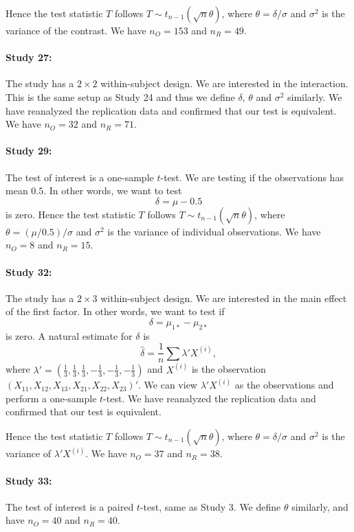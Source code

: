 \documentclass[11pt]{article}
\theoremstyle{definition}
\theoremstyle{custom}
\newcommand{\hdelta}{\hat{\delta}}
\begin{document}
  Hence the test statistic $T$ follows $T \sim t_{n-1}(\sqrt{n} \theta)$, where $\theta = \delta / \sigma$ and $\sigma^2$ is the variance of the contrast. We have $n_O = 153$ and $n_R = 49$.

  \paragraph{Study 27: \citet{Yap:2008fm}}
  The study has a $2 \times 2$ within-subject design. We are interested in the interaction. This is the same setup as Study 24 and thus we define $\delta$, $\theta$ and $\sigma^2$ similarly. We have reanalyzed the replication data and confirmed that our test is equivalent. We have $n_O = 32$ and $n_R = 71$.

  \paragraph{Study 29: \citet{TurkBrowne:2008bg}}
  The test of interest is a one-sample $t$-test. We are testing if the observations has mean $0.5$. In other words, we want to test
  \[
  \delta = \mu - 0.5
  \]
  is zero. Hence the test statistic $T$ follows $T \sim t_{n-1}(\sqrt{n} \theta)$, where $\theta = (\mu / 0.5) / \sigma$ and $\sigma^2$ is the variance of individual observations. We have $n_O = 8$ and $n_R = 15$.

  \paragraph{Study 32: \citet{White:2008fb}}
  The study has a $2 \times 3$ within-subject design. We are interested in the main effect of the first factor. In other words, we want to test if
  \[
  \delta = \mu_{1*} - \mu_{2*}
  \]
  is zero. A natural estimate for $\delta$ is
  \[
  \hdelta = \frac{1}{n} \sum \lambda' X^{(i)},
  \]
  where $\lambda' = (\frac{1}{3}, \frac{1}{3}, \frac{1}{3}, -\frac{1}{3}, -\frac{1}{3}, -\frac{1}{3})$ and $X^{(i)}$ is the observation $(X_{11}, X_{12}, X_{13}, X_{21}, X_{22}, X_{23})'$. We can view $\lambda' X^{(i)}$ as the observations and perform a one-sample $t$-test. We have reanalyzed the replication data and confirmed that our test is equivalent.

  Hence the test statistic $T$ follows $T \sim t_{n-1}(\sqrt{n} \theta)$, where $\theta = \delta / \sigma$ and $\sigma^2$ is the variance of $\lambda' X^{(i)}$. We have $n_O = 37$ and $n_R = 38$.

  \paragraph{Study 33: \citet{Farrell:2008hr}}
  The test of interest is a paired $t$-test, same as Study 3. We define $\theta$ similarly, and have $n_O = 40$ and $n_R = 40$.
\end{document}

